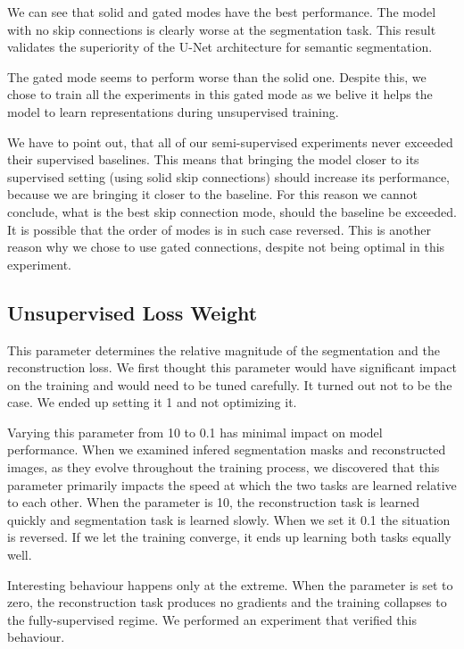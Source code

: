 We can see that solid and gated modes have the best performance. The model with no skip connections is clearly worse at the segmentation task. This result validates the superiority of the U-Net architecture for semantic segmentation.

The gated mode seems to perform worse than the solid one. Despite this, we chose to train all the experiments in this gated mode as we belive it helps the model to learn representations during unsupervised training.

We have to point out, that all of our semi-supervised experiments never exceeded their supervised baselines. This means that bringing the model closer to its supervised setting (using solid skip connections) should increase its performance, because we are bringing it closer to the baseline. For this reason we cannot conclude, what is the best skip connection mode, should the baseline be exceeded. It is possible that the order of modes is in such case reversed. This is another reason why we chose to use gated connections, despite not being optimal in this experiment.


\subsection{Unsupervised Loss Weight}
\label{sec:UnsupervisedLossWeight}

This parameter determines the relative magnitude of the segmentation and the reconstruction loss. We first thought this parameter would have significant impact on the training and would need to be tuned carefully. It turned out not to be the case. We ended up setting it 1 and not optimizing it.

Varying this parameter from 10 to 0.1 has minimal impact on model performance. When we examined infered segmentation masks and reconstructed images, as they evolve throughout the training process, we discovered that this parameter primarily impacts the speed at which the two tasks are learned relative to each other. When the parameter is 10, the reconstruction task is learned quickly and segmentation task is learned slowly. When we set it 0.1 the situation is reversed. If we let the training converge, it ends up learning both tasks equally well.

Interesting behaviour happens only at the extreme. When the parameter is set to zero, the reconstruction task produces no gradients and the training collapses to the fully-supervised regime. We performed an experiment that verified this behaviour.


